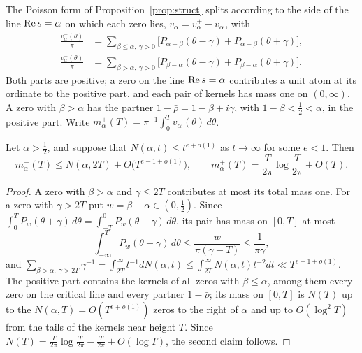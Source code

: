 The Poisson form of Proposition~\ref{prop:struct} splits according to the side of the line $\operatorname{Re} s=\alpha$ on which each zero lies, $v_\alpha=v_\alpha^+-v_\alpha^-$, with
\begin{equation}\label{ag:eq:split}
\begin{aligned}
\frac{v_\alpha^+(\theta)}\pi&=\sum_{\beta\le\alpha,\ \gamma>0}\big[P_{\alpha-\beta}(\theta-\gamma)+P_{\alpha-\beta}(\theta+\gamma)\big],\\
\frac{v_\alpha^-(\theta)}\pi&=\sum_{\beta>\alpha,\ \gamma>0}\big[P_{\beta-\alpha}(\theta-\gamma)+P_{\beta-\alpha}(\theta+\gamma)\big].
\end{aligned}
\end{equation}
Both parts are positive; a zero on the line $\operatorname{Re} s=\alpha$ contributes a unit atom at its ordinate to the positive part, and each pair of kernels has mass one on $(0,\infty)$. A zero with $\beta>\alpha$ has the partner $1-\bar\rho=1-\beta+i\gamma$, with $1-\beta<\frac12<\alpha$, in the positive part. Write $m_\alpha^\pm(T)=\pi^{-1}\int_0^Tv_\alpha^\pm(\theta)\,d\theta$.

\begin{lemma}\label{ag:lem:mass}
Let $\alpha>\frac12$, and suppose that $N(\alpha,t)\le t^{e+o(1)}$ as $t\to\infty$ for some $e<1$. Then
\[
m_\alpha^-(T)\le N(\alpha,2T)+O\big(T^{e-1+o(1)}\big),\qquad m_\alpha^+(T)=\frac T{2\pi}\log\frac T{2\pi}+O(T).
\]
\end{lemma}

\begin{proof}
A zero with $\beta>\alpha$ and $\gamma\le2T$ contributes at most its total mass one. For a zero with $\gamma>2T$ put $w=\beta-\alpha\in(0,\frac12)$. Since $\int_0^TP_w(\theta+\gamma)\,d\theta=\int_{-T}^0P_w(\theta-\gamma)\,d\theta$, its pair has mass on $[0,T]$ at most
\[
\int_{-\infty}^TP_w(\theta-\gamma)\,d\theta\le\frac{w}{\pi(\gamma-T)}\le\frac1{\pi\gamma},
\]
and $\sum_{\beta>\alpha,\ \gamma>2T}\gamma^{-1}=\int_{2T}^\infty t^{-1}dN(\alpha,t)\le\int_{2T}^\infty N(\alpha,t)t^{-2}dt\ll T^{e-1+o(1)}$. The positive part contains the kernels of all zeros with $\beta\le\alpha$, among them every zero on the critical line and every partner $1-\bar\rho$; its mass on $[0,T]$ is $N(T)$ up to the $N(\alpha,T)=O(T^{e+o(1)})$ zeros to the right of $\alpha$ and up to $O(\log^2T)$ from the tails of the kernels near height $T$. Since $N(T)=\frac T{2\pi}\log\frac T{2\pi}-\frac T{2\pi}+O(\log T)$, the second claim follows.
\end{proof}


